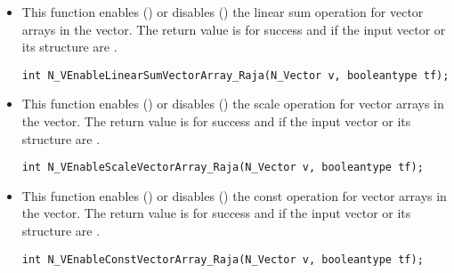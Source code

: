 \begin{itemize}


\item {}

This function enables () or disables () the linear sum
operation for vector arrays in the {\raja} vector. The return value is  for
success and  if the input vector or its  structure are .

\verb|int N_VEnableLinearSumVectorArray_Raja(N_Vector v, booleantype tf);|


\item {}

This function enables () or disables () the scale
operation for vector arrays in the {\raja} vector. The return value is  for
success and  if the input vector or its  structure are .

\verb|int N_VEnableScaleVectorArray_Raja(N_Vector v, booleantype tf);|


\item {}

This function enables () or disables () the const
operation for vector arrays in the {\raja} vector. The return value is  for
success and  if the input vector or its  structure are .

\verb|int N_VEnableConstVectorArray_Raja(N_Vector v, booleantype tf);|







\end{itemize}
